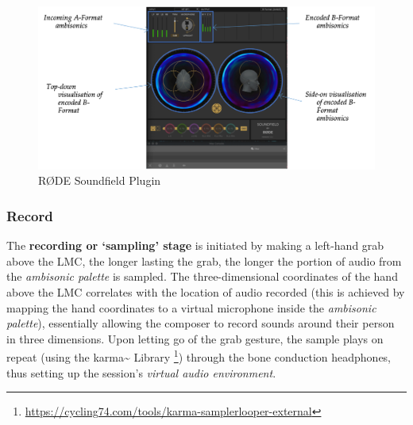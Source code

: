 \begin{figure}
    \centering
    \includegraphics[width=\linewidth]{figures/05-area/areatechnical_rode.png}
    \caption{RØDE Soundfield Plugin}
    \label{fig: areatechnicalrode}
\end{figure}

\subsubsection{Record}                          \label{sec: area-system-software-record}
The \textbf{recording or ‘sampling’ stage} is initiated by making a left-hand grab above the LMC, the longer lasting the grab, the longer the portion of audio from the \textit{ambisonic palette} is sampled. The three-dimensional coordinates of the hand above the LMC correlates with the location of audio recorded (this is achieved by mapping the hand coordinates to a virtual microphone inside the \textit{ambisonic palette}), essentially allowing the composer to record sounds around their person in three dimensions. Upon letting go of the grab gesture, the sample plays on repeat (using the karma\textasciitilde{} Library \footnote{\url{https://cycling74.com/tools/karma-samplerlooper-external}}) through the bone conduction headphones, thus setting up the session’s \textit{virtual audio environment}.

